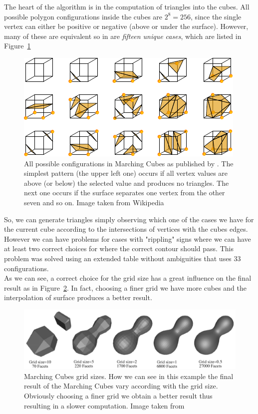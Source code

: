 The heart of the algorithm is in the computation of triangles into the cubes. All possible polygon configurations inside the cubes are $2^{8} = 256$, since the single vertex can either be positive or negative (above or under the surface). However, many of these are equivalent so in \cite{Lorensen} are \textit{fifteen unique cases}, which are listed in Figure~\ref{fig:MarchingCubesCases}

\begin{figure}[htb] %
   \centering
   \includegraphics[width=0.60\linewidth]{images/MarchingCubes.pdf}
   \caption[All possible configurations in Marching Cubes]{All possible configurations in Marching Cubes as published by \cite{Lorensen}. The simplest pattern (the upper left one) occurs if all vertex values are above (or below) the selected value and produces no triangles. The next one occurs if the surface separates one vertex from the other seven and so on. Image taken from Wikipedia}
   \label{fig:MarchingCubesCases}
\end{figure}

So, we can generate triangles simply observing which one of the cases we have for the current cube according to the intersections of vertices with the cubes edges. However we can have problems for cases with "rippling" signs where we can have at least two correct choices for where the correct contour should pass. This problem was solved using an extended table without ambiguities that uses 33 configurations.\\

As we can see, a correct choice for the grid size has a great influence on the final result as in Figure~\ref{fig:MarchingGrid}. In fact, choosing a finer grid we have more cubes and the interpolation of surface produces a better result.

\begin{figure}[htb] %
   \centering
   \includegraphics[width=0.90\linewidth]{images/polygoniseMarching.pdf}
   \caption[Marching Cubes grid sizes]{Marching Cubes grid sizes. How we can see in this example the final result of the Marching Cubes vary according with the grid size. Obviously choosing a finer grid we obtain a better result thus resulting in a slower computation. Image taken from \cite{Bourke}}
   \label{fig:MarchingGrid}
\end{figure}


